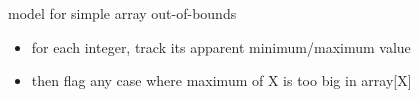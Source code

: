 \begin{frame}{model for simple array out-of-bounds}
    \begin{itemize}
    \item for each integer, track its apparent minimum/maximum value
    \item then flag any case where maximum of X is too big in array[X]
    \end{itemize}
\end{frame}

